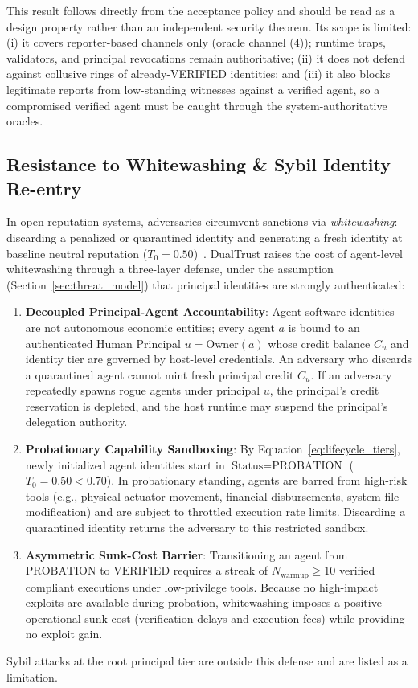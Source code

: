 \documentclass[journal]{IEEEtran}
\begin{document}
This result follows directly from the acceptance policy and should be read as a design property rather than an independent security theorem. Its scope is limited: (i) it covers reporter-based channels only (oracle channel (4)); runtime traps, validators, and principal revocations remain authoritative; (ii) it does not defend against collusive rings of already-VERIFIED identities; and (iii) it also blocks legitimate reports from low-standing witnesses against a verified agent, so a compromised verified agent must be caught through the system-authoritative oracles.

\subsection{Resistance to Whitewashing \& Sybil Identity Re-entry}
\label{sec:whitewashing}
In open reputation systems, adversaries circumvent sanctions via \emph{whitewashing}: discarding a penalized or quarantined identity and generating a fresh identity at baseline neutral reputation ($T_0 = 0.50$)~\cite{douceur2002sybil}. DualTrust raises the cost of agent-level whitewashing through a three-layer defense, under the assumption (Section~\ref{sec:threat_model}) that principal identities are strongly authenticated:
\begin{enumerate}[leftmargin=12pt, topsep=2pt, itemsep=1pt]
\item \textbf{Decoupled Principal-Agent Accountability}: Agent software identities are not autonomous economic entities; every agent $a$ is bound to an authenticated Human Principal $u = \text{Owner}(a)$ whose credit balance $C_u$ and identity tier are governed by host-level credentials. An adversary who discards a quarantined agent cannot mint fresh principal credit $C_u$. If an adversary repeatedly spawns rogue agents under principal $u$, the principal's credit reservation is depleted, and the host runtime may suspend the principal's delegation authority.
\item \textbf{Probationary Capability Sandboxing}: By Equation~\eqref{eq:lifecycle_tiers}, newly initialized agent identities start in $\text{Status} = \text{PROBATION}$ ($T_0 = 0.50 < 0.70$). In probationary standing, agents are barred from high-risk tools (e.g., physical actuator movement, financial disbursements, system file modification) and are subject to throttled execution rate limits. Discarding a quarantined identity returns the adversary to this restricted sandbox.
\item \textbf{Asymmetric Sunk-Cost Barrier}: Transitioning an agent from $\text{PROBATION}$ to $\text{VERIFIED}$ requires a streak of $N_{\text{warmup}} \ge 10$ verified compliant executions under low-privilege tools. Because no high-impact exploits are available during probation, whitewashing imposes a positive operational sunk cost (verification delays and execution fees) while providing no exploit gain.
\end{enumerate}
Sybil attacks at the root principal tier are outside this defense and are listed as a limitation.
\end{document}
